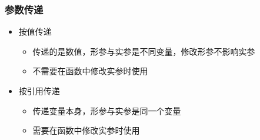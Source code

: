 \begin{frame}[fragile]
    \frametitle{参数传递}

        \begin{itemize}
            \item 按值传递

            \begin{itemize}
                \item 传递的是数值，形参与实参是不同变量，修改形参不影响实参
                \item 不需要在函数中修改实参时使用
            \end{itemize}
            
            \item 按引用传递

            \begin{itemize}
                \item 传递变量本身，形参与实参是同一个变量
                \item 需要在函数中修改实参时使用
            \end{itemize}
            
        \end{itemize}
    
\end{frame}


